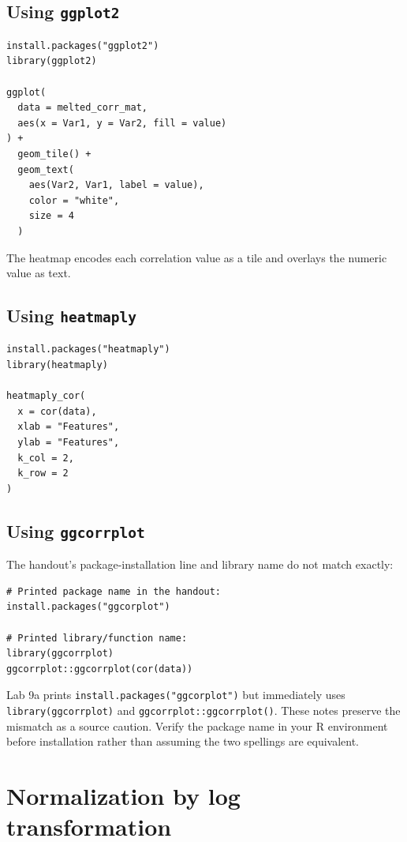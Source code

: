 \subsection{Using \texttt{ggplot2}}

\begin{lstlisting}[style=dsr]
install.packages("ggplot2")
library(ggplot2)

ggplot(
  data = melted_corr_mat,
  aes(x = Var1, y = Var2, fill = value)
) +
  geom_tile() +
  geom_text(
    aes(Var2, Var1, label = value),
    color = "white",
    size = 4
  )
\end{lstlisting}

The heatmap encodes each correlation value as a tile and overlays the numeric value as text.

\subsection{Using \texttt{heatmaply}}

\begin{lstlisting}[style=dsr]
install.packages("heatmaply")
library(heatmaply)

heatmaply_cor(
  x = cor(data),
  xlab = "Features",
  ylab = "Features",
  k_col = 2,
  k_row = 2
)
\end{lstlisting}

\subsection{Using \texttt{ggcorrplot}}

The handout's package-installation line and library name do not match exactly:

\begin{lstlisting}[style=dsr]
# Printed package name in the handout:
install.packages("ggcorplot")

# Printed library/function name:
library(ggcorrplot)
ggcorrplot::ggcorrplot(cor(data))
\end{lstlisting}

\begin{pitfall}
Lab 9a prints \texttt{install.packages("ggcorplot")} but immediately uses \texttt{library(ggcorrplot)} and \texttt{ggcorrplot::ggcorrplot()}. These notes preserve the mismatch as a source caution. Verify the package name in your R environment before installation rather than assuming the two spellings are equivalent.
\end{pitfall}

\section{Normalization by log transformation}

